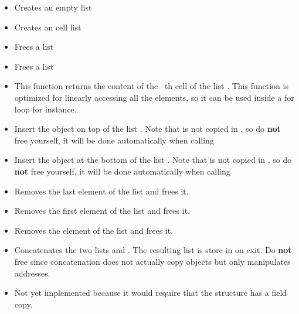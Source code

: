 \begin{itemize}
\item {}
  \sshortdescribe Creates an empty list
\item {}
  \sshortdescribe Creates an cell list
\item {}
  \sshortdescribe Frees a list
\item {}
  \sshortdescribe Frees a list
\item {}
  \sshortdescribe This function returns the content of the --th cell of
  the list . This function is optimized for linearly accessing all the
  elements, so it can be used inside a for loop for instance.
\item {}
  \sshortdescribe Insert the object  on top of the list . Note that
   is not copied in , so do  {\bf not} free  yourself, it
  will be done automatically when calling 
\item {}
  \sshortdescribe Insert the object  at the bottom of the list . Note that
   is not copied in , so do  {\bf not} free  yourself, it
  will be done automatically when calling 
\item {}
  \sshortdescribe Removes the last element of the list  and frees it.
\item {}
  \sshortdescribe Removes the first element of the list  and frees it.
\item {}
  \sshortdescribe Removes the  element of the list  and frees it.
\item {}
  \sshortdescribe Concatenates the two lists  and . The
  resulting list is store in  on exit. Do {\bf not} free 
  since concatenation does not actually copy objects but only manipulates
  addresses.
\item {}
  \sshortdescribe Not yet implemented because it would require that the
  structure  has a field copy.
\end{itemize}

